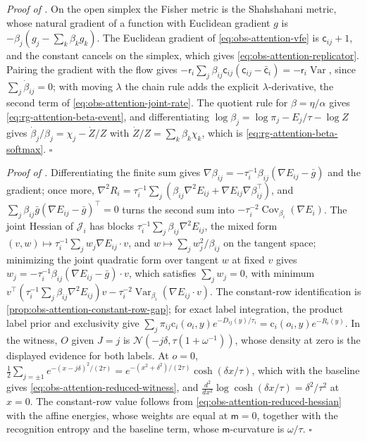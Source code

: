 \noindent\emph{Proof of .}
On the open simplex the Fisher metric is the Shahshahani metric, whose natural
gradient of a function with Euclidean gradient \(g\) is
\(-\beta_j(g_j-\sum_k\beta_kg_k)\). The Euclidean gradient of
\eqref{eq:obs-attention-vfe} is \(\mathsf c_{ij}+1\), and the constant cancels
on the simplex, which gives \eqref{eq:obs-attention-replicator}. Pairing the
gradient with the flow gives \(-\mathsf r_i\sum_j\beta_{ij}\mathsf c_{ij}
(\mathsf c_{ij}-\bar{\mathsf c}_i)=-\mathsf r_i\operatorname{Var}\), since
\(\sum_j\dot\beta_{ij}=0\); with moving \(\lambda\) the chain rule adds the
explicit \(\lambda\)-derivative, the second term of
\eqref{eq:obs-attention-joint-rate}. The quotient rule for \(\beta=\eta/\alpha\)
gives \eqref{eq:rg-attention-beta-event}, and differentiating
\(\log\beta_j=\log\pi_j-E_j/\tau-\log Z\) gives
\(\dot\beta_j/\beta_j=\chi_j-\dot Z/Z\) with \(\dot Z/Z=\sum_k\beta_k\chi_k\),
which is \eqref{eq:rg-attention-beta-softmax}. \(\square\)

\noindent\emph{Proof of .}
Differentiating the finite sum gives
\(\nabla\beta_{ij}=-\tau_i^{-1}\beta_{ij}(\nabla E_{ij}-\bar g)\) and the
gradient; once more,
\(\nabla^2R_i=\tau_i^{-1}\sum_j(\beta_{ij}\nabla^2E_{ij}+\nabla E_{ij}\nabla\beta_{ij}^\top)\),
and \(\sum_j\beta_{ij}\bar g(\nabla E_{ij}-\bar g)^\top=0\) turns the second
sum into \(-\tau_i^{-2}\operatorname{Cov}_{\beta_i}(\nabla E_i)\). The joint
Hessian of \(\mathscr J_i\) has blocks
\(\tau_i^{-1}\sum_j\beta_{ij}\nabla^2E_{ij}\), the mixed form
\((v,w)\mapsto\tau_i^{-1}\sum_jw_j\nabla E_{ij}\cdot v\), and
\(w\mapsto\sum_jw_j^2/\beta_{ij}\) on the tangent space; minimizing the joint
quadratic form over tangent \(w\) at fixed \(v\) gives
\(w_j=-\tau_i^{-1}\beta_{ij}(\nabla E_{ij}-\bar g)\cdot v\), which satisfies
\(\sum_jw_j=0\), with minimum
\(v^\top(\tau_i^{-1}\sum_j\beta_{ij}\nabla^2E_{ij})v
-\tau_i^{-2}\operatorname{Var}_{\beta_i}(\nabla E_{ij}\cdot v)\). The
constant-row identification is \cref{prop:obs-attention-constant-row-gap}; for
exact label integration, the product label prior and exclusivity give
\(\sum_j\pi_{ij}\mathrm c_i(o_i,y)e^{-D_{ij}(y)/\tau_i}
=\mathrm c_i(o_i,y)e^{-R_i(y)}\). In the witness, \(O\) given \(J=j\) is
\(\mathcal N(-j\delta,\tau(1+\omega^{-1}))\), whose density at zero is the
displayed evidence for both labels. At \(o=0\),
\(\frac12\sum_{j=\pm1}e^{-(x-j\delta)^2/(2\tau)}=e^{-(x^2+\delta^2)/(2\tau)}
\cosh(\delta x/\tau)\), which with the baseline gives
\eqref{eq:obs-attention-reduced-witness}, and
\(\frac{d^2}{dx^2}\log\cosh(\delta x/\tau)=\delta^2/\tau^2\) at \(x=0\). The
constant-row value follows from \eqref{eq:obs-attention-reduced-hessian} with
the affine energies, whose weights are equal at \(\mathsf m=0\), together with
the recognition entropy and the baseline term, whose \(\mathsf m\)-curvature is
\(\omega/\tau\). \(\square\)

